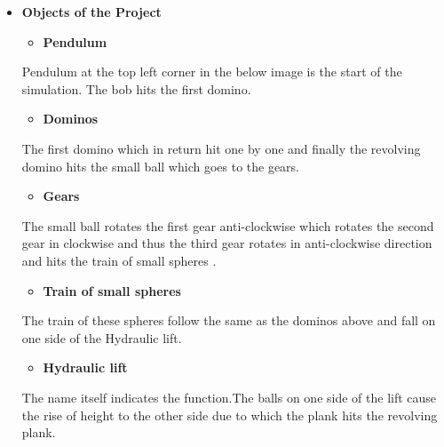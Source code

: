 \documentclass{article}
\begin{document}
\begin{itemize}
 \item[] \textbf{\LARGE Objects of the Project} \\
        \begin{itemize}[label=$\blacksquare$] \vspace{0cm}
            \item \textbf{\Large Pendulum} 
        \end{itemize}
        \large Pendulum at the top left corner in the below image is the start of the simulation. The bob hits the first domino. \\ \vspace{0.2cm}

        \begin{itemize}[label=$\blacksquare$] \vspace{0cm}
            \item \textbf{\Large Dominos } 
        \end{itemize} 
        \large The first domino which in return hit one by one and finally the revolving domino hits the small ball which goes to the gears. \\ \vspace{0.2 cm}

        \begin{itemize}[label=$\blacksquare$] \vspace{0cm}
            \item \textbf{\Large Gears } 
        \end{itemize}
        \large The small ball rotates the first gear anti-clockwise which rotates the second gear in clockwise and thus the third gear rotates in anti-clockwise direction and hits the train of small spheres .\\ \vspace{0.55 cm}

        \begin{itemize}[label=$\blacksquare$] \vspace{0cm}
            \item \textbf{\Large Train of small spheres } 
        \end{itemize}
        \large The train of these spheres follow the same as the dominos above and fall on one side of the Hydraulic lift.\\ \vspace{0.2 cm}

        \begin{itemize}[label=$\blacksquare$] \vspace{0cm}
            \item \textbf{\Large Hydraulic lift } 
        \end{itemize}
        \large The name itself indicates the function.The balls on one side of the lift cause the rise of height to the other side due to which the plank hits the revolving plank. \\ \vspace{0.2 cm}


\end{itemize}
\end{document}
